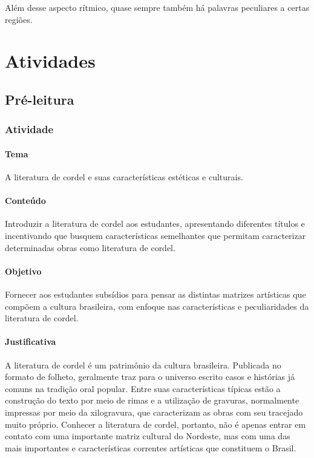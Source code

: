 \documentclass[11pt]{extarticle}
\begin{document}
Além desse aspecto rítmico, quase sempre também há palavras peculiares a certas
regiões. 


\section{Atividades}

\subsection{Pré-leitura}

\subsubsection{Atividade}


\paragraph{Tema} A literatura de cordel e suas características estéticas e culturais.

\paragraph{Conteúdo} Introduzir a literatura de cordel aos estudantes, apresentando diferentes títulos e incentivando que busquem características semelhantes que permitam caracterizar determinadas obras como literatura de cordel.

\paragraph{Objetivo} Fornecer aos estudantes subsídios para pensar as distintas matrizes artísticas que compõem a cultura brasileira, com enfoque nas características e peculiaridades da literatura de cordel.

\paragraph{Justificativa} A literatura de cordel é um patrimônio da cultura brasileira. Publicada no formato de folheto, geralmente traz para o universo escrito casos e histórias já comuns na tradição oral popular. Entre suas características típicas estão a construção do texto por meio de rimas e a utilização de gravuras, normalmente impressas por meio da xilogravura, que caracterizam as obras com seu tracejado muito próprio. Conhecer a literatura de cordel, portanto, não é apenas entrar em contato com uma importante matriz cultural do Nordeste, mas com uma das mais importantes e características correntes artísticas que constituem o Brasil.
\end{document}
